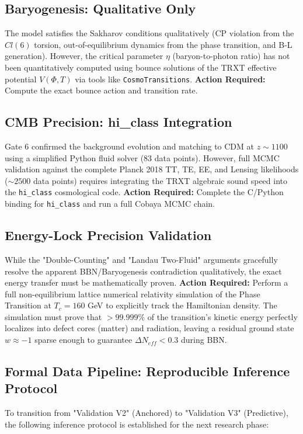 \documentclass[a4paper,12pt]{article}
\begin{document}
\subsection{Baryogenesis: Qualitative Only}
The model satisfies the Sakharov conditions qualitatively (CP violation from the $Cl(6)$ torsion, out-of-equilibrium dynamics from the phase transition, and B-L generation). However, the critical parameter $\eta$ (baryon-to-photon ratio) has not been quantitatively computed using bounce solutions of the TRXT effective potential $V(\Phi, T)$ via tools like \texttt{CosmoTransitions}. \textbf{Action Required:} Compute the exact bounce action and transition rate.

\subsection{CMB Precision: hi\_class Integration}
Gate 6 confirmed the background evolution and matching to CDM at $z \sim 1100$ using a simplified Python fluid solver (83 data points). However, full MCMC validation against the complete Planck 2018 TT, TE, EE, and Lensing likelihoods ($\sim 2500$ data points) requires integrating the TRXT algebraic sound speed into the \texttt{hi\_class} cosmological code. \textbf{Action Required:} Complete the C/Python binding for \texttt{hi\_class} and run a full Cobaya MCMC chain.

\subsection{Energy-Lock Precision Validation}
While the "Double-Counting" and "Landau Two-Fluid" arguments gracefully resolve the apparent BBN/Baryogenesis contradiction qualitatively, the exact energy transfer must be mathematically proven. \textbf{Action Required:} Perform a full non-equilibrium lattice numerical relativity simulation of the Phase Transition at $T_c = 160$ GeV to explicitly track the Hamiltonian density. The simulation must prove that $> 99.999\%$ of the transition's kinetic energy perfectly localizes into defect cores (matter) and radiation, leaving a residual ground state $w \approx -1$ sparse enough to guarantee $\Delta N_{eff} < 0.3$ during BBN.

\subsection{Formal Data Pipeline: Reproducible Inference Protocol}
To transition from "Validation V2" (Anchored) to "Validation V3" (Predictive), the following inference protocol is established for the next research phase:
\end{document}
